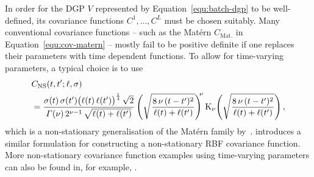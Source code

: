 In order for the DGP $V$ represented by Equation~\eqref{equ:batch-dgp} to be well-defined, its covariance functions $C^1,\ldots, C^L$ must be chosen suitably. Many conventional covariance functions -- such as the Mat\'{e}rn $C_{\mathrm{Mat.}}$ in Equation~\eqref{equ:cov-matern} -- mostly fail to be positive definite if one replaces their parameters with time dependent functions. To allow for time-varying parameters, a typical choice is to use
%
\begin{equation}
	\begin{split}
		&C_{\mathrm{NS}}(t, t'; \ell, \sigma) \\
		&= \frac{\sigma(t) \, \sigma(t') \big(\ell(t) \, \ell(t')\big)^{\frac{1}{4}} \, \sqrt{2}}{\varGamma(\nu) \, 2^{\nu-1} \, \sqrt{\ell(t) + \ell(t')}} \left(\sqrt{\frac{8 \, \nu \, (t-t')^2}{\ell(t) + \ell(t')}}\right)^{\!\!\nu} \operatorname{K_\nu}\!\left(\sqrt{\frac{8 \, \nu \, (t-t')^2}{\ell(t) + \ell(t')}}\right),
		\label{equ:cov-ns-matern}
	\end{split}
\end{equation}
%
which is a non-stationary generalisation of the Mat\'{e}rn family by~\citet{Paciorek2004, Paciorek2006}. \citet{Gibbs} introduces a similar formulation for constructing a non-stationary RBF covariance function. More non-stationary covariance function examples using time-varying parameters can also be found in, for example, \citet{Higdon1999non, Snoek2014, Remes2017}.

